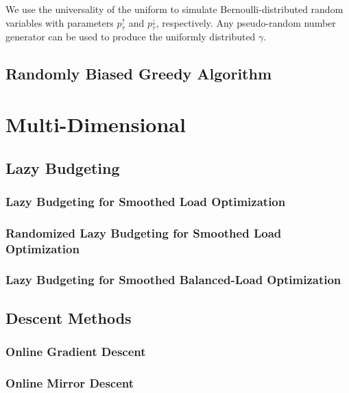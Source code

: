 We use the universality of the uniform to simulate Bernoulli-distributed random variables with parameters $p_{\tau}^{\uparrow}$ and $p_{\tau}^{\downarrow}$, respectively. Any pseudo-random number generator can be used to produce the uniformly distributed $\gamma$.

\subsection{Randomly Biased Greedy Algorithm}

\section{Multi-Dimensional}\label{section:online_algorithms:md}

\subsection{Lazy Budgeting}\label{section:online_algorithms:md:lazy_budgeting}

\subsubsection{Lazy Budgeting for Smoothed Load Optimization}

\subsubsection{Randomized Lazy Budgeting for Smoothed Load Optimization}

\subsubsection{Lazy Budgeting for Smoothed Balanced-Load Optimization}

\subsection{Descent Methods}\label{section:online_algorithms:md:descent_methods}

\subsubsection{Online Gradient Descent}

\subsubsection{Online Mirror Descent}

